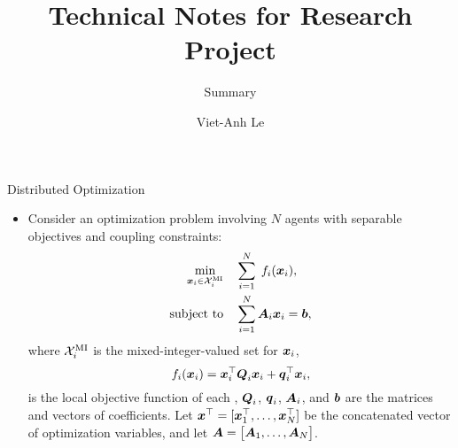\documentclass[9pt]{beamer}
\title[Research] %
{Technical Notes for Research Project}
\subtitle{Summary}
\author[Viet-Anh Le] %
{Viet-Anh Le\inst{1,2}}
\institute[UD] %
{
\inst{1}%
University of Delaware
\\
\inst{2}%
Cornell University
}
\begin{document}
\frame{\titlepage}



\begin{frame}{Distributed Optimization}
\begin{itemize}
\item Consider an optimization problem involving $N$ agents with separable objectives and coupling constraints:
\begin{equation}
\begin{split}
\underset{\boldsymbol{x}_i \in \mathcal{X}_i^{\rm{MI}}}{\min} & \quad \sum_{i=1}^N \; f_i (\boldsymbol{x}_i), \\
\text{subject to} & \quad \sum_{i=1}^N \boldsymbol{A}_{i} \boldsymbol{x}_i = \boldsymbol{b}, \\
\end{split}
\end{equation}
where $\mathcal{X}_i^{\rm{MI}}$ is the mixed-integer-valued set for $\boldsymbol{x}_i$,
\[
f_i (\boldsymbol{x}_i) = \boldsymbol{x}_i^\top \boldsymbol{Q}_i \boldsymbol{x}_i + \boldsymbol{q}_i^\top \boldsymbol{x}_i,
\]
is the local objective function of each ,
$\boldsymbol{Q}_i$, $\boldsymbol{q}_i$, $\boldsymbol{A}_{i}$, and $\boldsymbol{b}$ are the matrices and vectors of coefficients.
Let $\boldsymbol{x}^\top = [\boldsymbol{x}_1^\top, \dots, \boldsymbol{x}_N^\top]$ be the concatenated vector of optimization variables, and let
$\boldsymbol{A} = \big[ \boldsymbol{A}_1, \dots, \boldsymbol{A}_N \big]$.
\end{itemize}
\end{frame}
\end{document}
